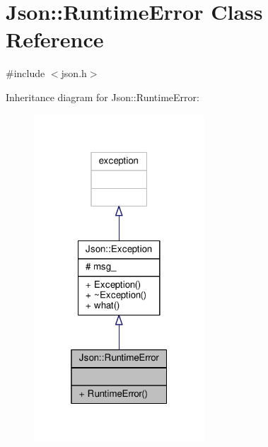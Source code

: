 \hypertarget{classJson_1_1RuntimeError}{}\section{Json\+:\+:Runtime\+Error Class Reference}
\label{classJson_1_1RuntimeError}


{\ttfamily \#include $<$json.\+h$>$}



Inheritance diagram for Json\+:\+:Runtime\+Error\+:
\nopagebreak
\begin{figure}[H]
\begin{center}
\leavevmode
\includegraphics[width=181pt]{d7/d02/classJson_1_1RuntimeError__inherit__graph}
\end{center}
\end{figure}


